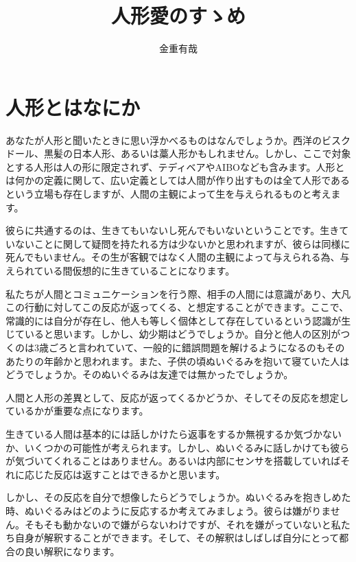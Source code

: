 \documentclass[b5j,twoside,twocolumn]{utarticle}
\title{人形愛のすゝめ}
\author{金重有哉}
\date{\vspace{-5mm}}
\makeatletter
\def\yakuchu{%
\@ifnextchar[\@xfootnote %
{\stepcounter{yakuchu}%
\protected@xdef\@thefnmark{\theyakuchu}%
\@footnotemark\@footnotetext}}
\makeatother
\begin{document}
\maketitle

\setlength{\footskip}{-2mm}
\chead[]{}
\rhead[人形愛のすゝめ]{}
\lfoot[]{\thepage{}}
\cfoot[]{}
\rfoot[\thepage{}]{}

\let\yakuchu=\endnote
\renewcommand{\footnoterule}{\noindent\rule{100mm}{0.3mm}\vskip2mm}
\thispagestyle{fancy}
\section{人形とはなにか}
あなたが人形と聞いたときに思い浮かべるものはなんでしょうか。西洋のビスクドール、黒髪の日本人形、あるいは藁人形かもしれません。しかし、ここで対象とする人形は人の形に限定されず、テディベアやAIBOなども含みます。人形とは何かの定義に関して、広い定義としては人間が作り出すものは全て人形であるという立場も存在しますが、人間の主観によって生を与えられるものと考えます。


彼らに共通するのは、生きてもいないし死んでもいないということです。生きていないことに関して疑問を持たれる方は少ないかと思われますが、彼らは同様に死んでもいません。その生が客観ではなく人間の主観によって与えられる為、与えられている間仮想的に生きていることになります。


私たちが人間とコミュニケーションを行う際、相手の人間には意識があり、大凡この行動に対してこの反応が返ってくる、と想定することができます。ここで、常識的には自分が存在し、他人も等しく個体として存在しているという認識が生じていると思います。しかし、幼少期はどうでしょうか。自分と他人の区別がつくのは3歳ごろと言われていて、一般的に錯誤問題を解けるようになるのもそのあたりの年齢かと思われます。また、子供の頃ぬいぐるみを抱いて寝ていた人はどうでしょうか。そのぬいぐるみは友達では無かったでしょうか。


人間と人形の差異として、反応が返ってくるかどうか、そしてその反応を想定しているかが重要な点になります。


生きている人間は基本的には話しかけたら返事をするか無視するか気づかないか、いくつかの可能性が考えられます。しかし、ぬいぐるみに話しかけても彼らが気づいてくれることはありません。あるいは内部にセンサを搭載していればそれに応じた反応は返すことはできるかと思います。


しかし、その反応を自分で想像したらどうでしょうか。ぬいぐるみを抱きしめた時、ぬいぐるみはどのように反応するか考えてみましょう。彼らは嫌がりません。そもそも動かないので嫌がらないわけですが、それを嫌がっていないと私たち自身が解釈することができます。そして、その解釈はしばしば自分にとって都合の良い解釈になります。
\end{document}
